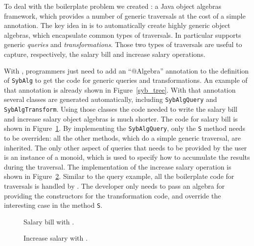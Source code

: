 To deal with the boilerplate problem we created \Name: a Java object
algebras framework, which provides a number of generic traversals at
the cost of a simple annotation. The key idea in \name is to
automatically create highly generic object algebras, which encapsulate
common types of traversals. In particular \name supports generic
\emph{queries} and \emph{transformations}. Those two types of
traversals are useful to capture, respectively, the salary bill and
increase salary operations.

With \Name, programmers just need to add an ``$@$Algebra'' annotation
to the definition of \lstinline{SybAlg} to get the code for generic
queries and transformations. An example of that annotation is already
shown in Figure~\ref{syb_tree}. With that annotation several classes
are generated automatically, including \lstinline{SybAlgQuery} and
\lstinline{SybAlgTransform}. Using those classes the code needed to
write the salary bill and increase salary object algebras is much
shorter. The code for salary bill is shown in
Figure~\ref{query_with_oaframework}. By implementing the
\lstinline{SybAlgQuery}, only the \lstinline{S} method needs to be
overriden: all the other methods, which do a simple generic traversal,
are inherited. The only other aspect of queries that needs to be
provided by the user is an instance of a monoid, which is used to
specify how to accumulate the results during the traversal. The
implementation of the increase salary operation is shown in
Figure~\ref{transform_with_oaframework}. Similar to the query example,
all the boilerplate code for traversals is handled by \Name. The
developer only needs to pass an algebra for providing the constructors
for the transformation code, and override the interesting case in the
method \lstinline{S}. 

\begin{figure}[tb]
\vspace{-.1in}
\caption{Salary bill with \Name.}
\label{query_with_oaframework}
\end{figure}
  
\begin{figure}[tb]
\vspace{-.1in}
\caption{Increase salary with \Name.}
\label{transform_with_oaframework}
\end{figure}

